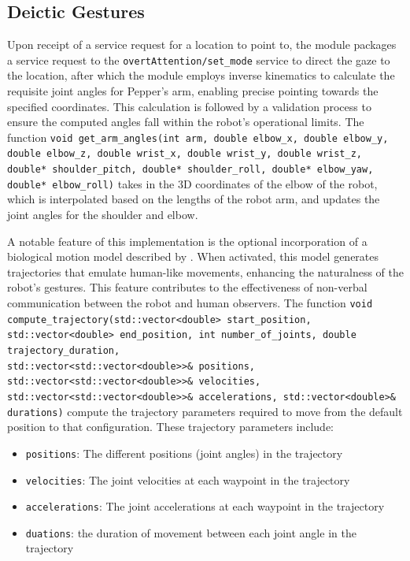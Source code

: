 \documentclass{CSSRforAfrica}
\begin{document}
\subsection{Deictic Gestures}

Upon receipt of a service request for a location to point to, the module packages a service request to the \texttt{overtAttention/set\_mode} service to direct the gaze to the location, after which the module employs inverse kinematics to calculate the requisite joint angles for Pepper's arm, enabling precise pointing towards the specified coordinates. This calculation is followed by a validation process to ensure the computed angles fall within the robot's operational limits. The function {\footnotesize \texttt{void get\_arm\_angles(int arm, double elbow\_x, double elbow\_y, double elbow\_z, double wrist\_x, double wrist\_y, double wrist\_z, double* shoulder\_pitch, double* shoulder\_roll, double* elbow\_yaw, double* elbow\_roll)}} takes in the 3D coordinates of the elbow of the robot, which is interpolated based on the lengths of the robot arm, and updates the joint angles for the shoulder and elbow.

A notable feature of this implementation is the optional incorporation of a biological motion model described by \cite{Huberetal2008}. When activated, this model generates trajectories that emulate human-like movements, enhancing the naturalness of the robot's gestures. This feature contributes to the effectiveness of non-verbal communication between the robot and human observers.  The function {\footnotesize \texttt{void compute\_trajectory(std::vector<double> start\_position, std::vector<double> end\_position, int number\_of\_joints, double trajectory\_duration, \\std::vector<std::vector<double>>\& positions, std::vector<std::vector<double>>\& velocities, std::vector<std::vector<double>>\& accelerations, std::vector<double>\& durations)}} compute the trajectory parameters required to move from the default position to that configuration. These trajectory parameters include:
\begin{itemize}
    \item \texttt{positions}: The different positions (joint angles) in the trajectory
    \item \texttt{velocities}: The joint velocities at each waypoint in the trajectory
    \item \texttt{accelerations}: The joint accelerations at each waypoint in the trajectory
    \item \texttt{duations}: the duration of movement between each joint angle in the trajectory
\end{itemize} 
\end{document}
